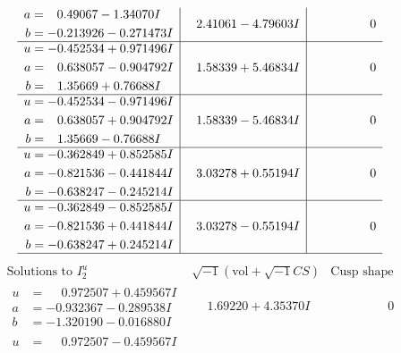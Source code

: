 \documentclass[1p]{elsarticle_modified}
\theoremstyle{definition}
\newcommand{\I}{\sqrt{-1}}
\begin{document}
$$\begin{array}{c|c|c}
\begin{aligned}
a &= \phantom{-}0.49067 - 1.34070 I \\
b &= -0.213926 - 0.271473 I\end{aligned}
 & \phantom{-}2.41061 - 4.79603 I & \phantom{-0.000000 } 0 \\ \hline\begin{aligned}
u &= -0.452534 + 0.971496 I \\
a &= \phantom{-}0.638057 - 0.904792 I \\
b &= \phantom{-}1.35669 + 0.76688 I\end{aligned}
 & \phantom{-}1.58339 + 5.46834 I & \phantom{-0.000000 } 0 \\ \hline\begin{aligned}
u &= -0.452534 - 0.971496 I \\
a &= \phantom{-}0.638057 + 0.904792 I \\
b &= \phantom{-}1.35669 - 0.76688 I\end{aligned}
 & \phantom{-}1.58339 - 5.46834 I & \phantom{-0.000000 } 0 \\ \hline\begin{aligned}
u &= -0.362849 + 0.852585 I \\
a &= -0.821536 - 0.441844 I \\
b &= -0.638247 - 0.245214 I\end{aligned}
 & \phantom{-}3.03278 + 0.55194 I & \phantom{-0.000000 } 0 \\ \hline\begin{aligned}
u &= -0.362849 - 0.852585 I \\
a &= -0.821536 + 0.441844 I \\
b &= -0.638247 + 0.245214 I\end{aligned}
 & \phantom{-}3.03278 - 0.55194 I & \phantom{-0.000000 } 0\\
 \hline 
 \end{array}$$\newpage$$\begin{array}{c|c|c}  
\text{Solutions to }I^u_{2}& \I (\text{vol} + \sqrt{-1}CS) & \text{Cusp shape}\\
 \hline 
\begin{aligned}
u &= \phantom{-}0.972507 + 0.459567 I \\
a &= -0.932367 - 0.289538 I \\
b &= -1.320190 - 0.016880 I\end{aligned}
 & \phantom{-}1.69220 + 4.35370 I & \phantom{-0.000000 } 0 \\ \hline\begin{aligned}
u &= \phantom{-}0.972507 - 0.459567 I \\

\end{aligned}
\end{array}$$
\end{document}
